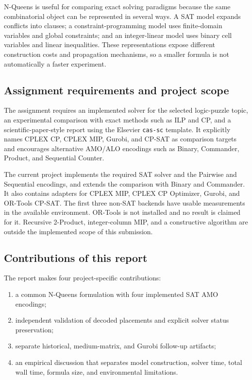 \documentclass[a4paper,fleqn]{cas-sc}
\begin{document}
N-Queens is useful for comparing exact solving paradigms because the same
combinatorial object can be represented in several ways. A SAT model expands
conflicts into clauses; a constraint-programming model uses finite-domain
variables and global constraints; and an integer-linear model uses binary cell
variables and linear inequalities. These representations expose different
construction costs and propagation mechanisms, so a smaller formula is not
automatically a faster experiment.

\subsection{Assignment requirements and project scope}
The assignment requires an implemented solver for the selected logic-puzzle
topic, an experimental comparison with exact methods such as ILP and CP, and a
scientific-paper-style report using the Elsevier \texttt{cas-sc} template. It
explicitly names CPLEX CP, CPLEX MIP, Gurobi, and CP-SAT as comparison targets
and encourages alternative AMO/ALO encodings such as Binary, Commander,
Product, and Sequential Counter.

The current project implements the required SAT solver and the Pairwise and
Sequential encodings, and extends the comparison with Binary and Commander.
It also contains adapters for CPLEX MIP, CPLEX CP Optimizer, Gurobi, and
OR-Tools CP-SAT. The first three non-SAT backends have usable measurements in
the available environment. OR-Tools is not installed and no result is
claimed for it. Recursive 2-Product, integer-column MIP, and a constructive
algorithm are outside the implemented scope of this submission.

\subsection{Contributions of this report}
The report makes four project-specific contributions:

\begin{enumerate}
  \item a common N-Queens formulation with four implemented SAT AMO encodings;
  \item independent validation of decoded placements and explicit solver
        status preservation;
  \item separate historical, medium-matrix, and Gurobi follow-up artifacts;
  \item an empirical discussion that separates model construction, solver
        time, total wall time, formula size, and environmental limitations.
\end{enumerate}
\end{document}
